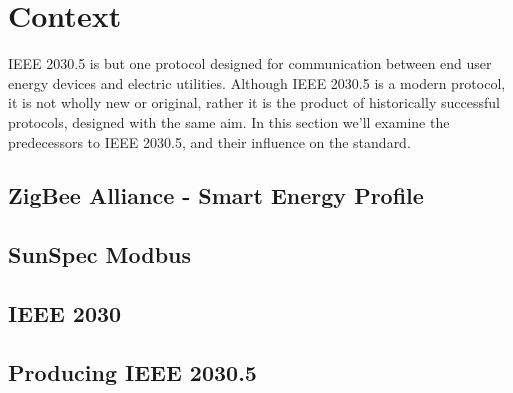 \chapter{Context}\label{ch:context}

IEEE 2030.5 is but one protocol designed for communication between end user energy devices and electric utilities. 
Although IEEE 2030.5 is a modern protocol, it is not wholly new or original, rather it is the product of historically successful protocols, designed with the same aim.
In this section we'll examine the predecessors to IEEE 2030.5, and their influence on the standard.

\section{ZigBee Alliance - Smart Energy Profile}




\section{SunSpec Modbus}


\section{IEEE 2030}


\section{Producing IEEE 2030.5}



